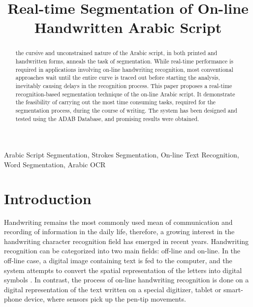 \documentclass[10pt, conference, compsocconf]{IEEEtran}
\begin{document}
\title{Real-time Segmentation of On-line Handwritten Arabic Script}

\author{
\and
{}
}

\maketitle

\begin{abstract}
the cursive and unconstrained nature of the Arabic script, in both printed and handwritten forms, anneals the task of segmentation. 
While real-time performance is required in applications involving on-line handwriting recognition, most conventional approaches wait until the entire curve is traced out before starting the analysis, inevitably causing delays in the recognition process. 
This paper proposes a real-time recognition-based segmentation technique of the on-line Arabic script.
It demonstrate the feasibility of carrying out the most time consuming tasks, required for the segmentation process, during the course of writing. 
The system has been designed and tested using the ADAB Database, and promising results were obtained.\\
\end{abstract}

\begin{IEEEkeywords}
Arabic Script Segmentation, Strokes Segmentation, On-line Text Recognition, Word Segmentation, Arabic OCR
\end{IEEEkeywords}

\section{Introduction}
Handwriting remains the most commonly used mean of communication and recording of information in the daily life, therefore, a growing interest in the handwriting character recognition field has emerged in recent years. 
Handwriting recognition can be categorized into two main fields: off-line and on-line. 
In the off-line case, a digital image containing text is fed to the computer, and the system attempts to convert the spatial representation of the letters into digital symbols \cite{al2011online}. 
In contrast, the process of on-line handwriting recognition is done on a digital representation of the text written on a special digitizer, tablet or smart-phone device, where sensors pick up the pen-tip movements.
 
\end{document}
